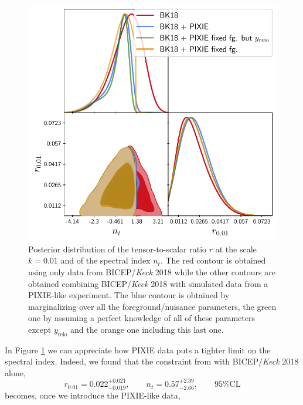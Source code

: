 \begin{figure}[t]
        \centering
        \includegraphics[width=.75\textwidth]{Constraints/nt.pdf}
        \caption{Posterior distribution of the tensor-to-scalar ratio $r$ at the scale $k=0.01$ and of the spectral index $n_t$. The red contour is obtained using only data from BICEP/\textit{Keck} 2018 \cite{Ade_2021} while the other contours are obtained combining BICEP/\textit{Keck} 2018 with simulated data from a PIXIE-like experiment. The blue contour is obtained by marginalizing over all the foreground/nuisance parameters, the green one by assuming a perfect knowledge of all of these parameters except $y_\text{reio}$ and the orange one including this last one.}
        \label{fig:nt_const}        
\end{figure}
In Figure \ref{fig:nt_const} we can appreciate how PIXIE data puts a tighter limit on the spectral index. Indeed, we found that the constraint from with BICEP/\emph{Keck} 2018 alone,
$$r_{0.01}=0.022^{+0.021}_{-0.019} ,\qquad n_t=0.57^{+2.39}_{-2.66},\qquad \text{95\%CL}$$
becomes, once we introduce the PIXIE-like data,
